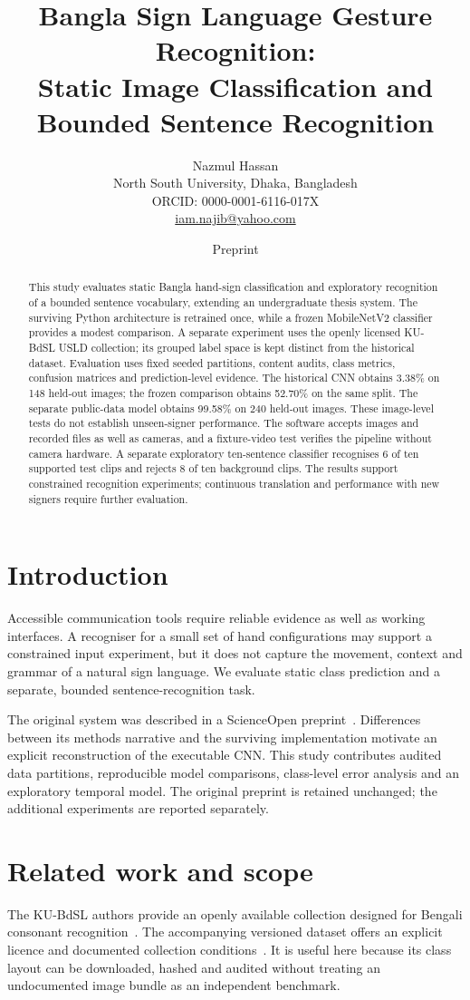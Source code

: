 \documentclass[11pt,a4paper]{article}
\title{Bangla Sign Language Gesture Recognition:\\Static Image Classification and Bounded Sentence Recognition}
\author{Nazmul Hassan\\North South University, Dhaka, Bangladesh\\\small ORCID: 0000-0001-6116-017X\\\small \href{mailto:iam.najib@yahoo.com}{iam.najib@yahoo.com}}
\date{\small Preprint}
\begin{document}
\maketitle
\begin{abstract}
This study evaluates static Bangla hand-sign classification and exploratory recognition of a bounded sentence vocabulary, extending an undergraduate thesis system. The surviving Python architecture is retrained once, while a frozen MobileNetV2 classifier provides a modest comparison. A separate experiment uses the openly licensed KU-BdSL USLD collection; its grouped label space is kept distinct from the historical dataset. Evaluation uses fixed seeded partitions, content audits, class metrics, confusion matrices and prediction-level evidence. The historical CNN obtains 3.38\% on 148 held-out images; the frozen comparison obtains 52.70\% on the same split. The separate public-data model obtains 99.58\% on 240 held-out images. These image-level tests do not establish unseen-signer performance. The software accepts images and recorded files as well as cameras, and a fixture-video test verifies the pipeline without camera hardware. A separate exploratory ten-sentence classifier recognises 6 of ten supported test clips and rejects 8 of ten background clips. The results support constrained recognition experiments; continuous translation and performance with new signers require further evaluation.
\end{abstract}
\section{Introduction}
Accessible communication tools require reliable evidence as well as working interfaces. A recogniser for a small set of hand configurations may support a constrained input experiment, but it does not capture the movement, context and grammar of a natural sign language. We evaluate static class prediction and a separate, bounded sentence-recognition task.

The original system was described in a ScienceOpen preprint~\cite{hassan}. Differences between its methods narrative and the surviving implementation motivate an explicit reconstruction of the executable CNN. This study contributes audited data partitions, reproducible model comparisons, class-level error analysis and an exploratory temporal model. The original preprint is retained unchanged; the additional experiments are reported separately.

\section{Related work and scope}
The KU-BdSL authors provide an openly available collection designed for Bengali consonant recognition~\cite{kubdsl}. The accompanying versioned dataset offers an explicit licence and documented collection conditions~\cite{kudata}. It is useful here because its class layout can be downloaded, hashed and audited without treating an undocumented image bundle as an independent benchmark.
\end{document}
